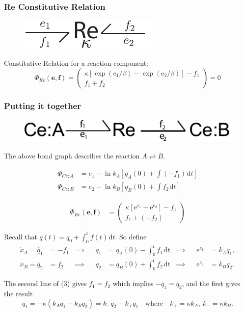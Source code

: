 \documentclass[10pt,reqno]{beamer}
\newcommand{\e}{\mathrm{e}}
\newcommand{\df}[1]{\mspace{2mu}  \mathrm{d}#1}
\begin{document}
\begin{frame}
\frametitle{Re Constitutive Relation}
\begin{figure}
	\includegraphics{images/twoport-Re.pdf}
\end{figure}
Constitutive Relation for a reaction component:
\[
\Phi_{Re}(\mathbf{e},\mathbf{f}) = \left(
\begin{matrix}
\kappa[\exp(\e_1/\beta) - \exp(\e_2/\beta)] - f_1\\
f_1 + f_2
\end{matrix}
\right) = 0
\]
\vfill
{}
\end{frame}
\begin{frame}
\frametitle{Putting it together}
\begin{figure}
	\includegraphics{images/bondgraph_ab}
\end{figure}
{\scriptsize
The above bond graph describes the reaction $A\rightleftharpoons B$.

\begin{minipage}{0.475\linewidth}
\begin{align}
\Phi_{Ce:A} &= e_1 - \ln k_A\left[q_A(0)  + \int(- f_1)\df{t}\right]\\
\Phi_{Ce:B} &= e_2 - \ln k_B\left[q_B(0)  + \int f_2\df{t}\right]
\end{align}
\end{minipage}\hfill
\begin{minipage}{0.475\linewidth}
\begin{align}
\Phi_{Re}(\mathbf{e},\mathbf{f}) &= \left(
\begin{matrix}
\kappa\left[\e^{e_1} - \e^{e_2}\right] - f_1\\
f_1 +(- f_2)
\end{matrix}
\right)
\end{align}	
\end{minipage}
\vspace{11pt}

Recall that $q(t) = q_0 + \int_0^t f(t)\df{t}$. So define 
\begin{align*}
\dot{x}_A  = \dot{q_1} &= -f_1 &\implies&& q_1 &= q_A(0) -\int_0^t f_1 \df{t} &\implies &&\e^{e_1} &= k_Aq_1, \\
\dot{x}_B = \dot{q_2} &= f_2 &\implies&& q_2 &= q_B(0) +\int_0^t f_2 \df{t} &\implies &&\e^{e_2} &= k_Bq_2.
\end{align*}

The second line of (3) gives $f_1 = f_2$ which implies $-\dot{q_1} = \dot{q_2}$, and the first gives the result
\[
\dot{q_1} = - \kappa\left(k_Aq_1 - k_Bq_2\right) = k_-q_2 - k_+q_1 \quad \text{where}\quad k_+ = \kappa k_A,\ k_- =\kappa k_B.
\]

}
\end{frame}
\end{document}
